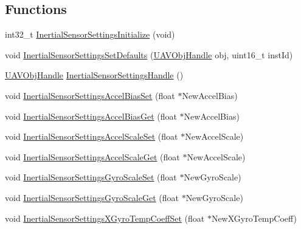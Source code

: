 \subsection*{\-Functions}
\begin{DoxyCompactItemize}
\item 
int32\-\_\-t \hyperlink{group___inertial_sensor_settings_ga45dd265a9f39272cac98af427a8ac647}{\-Inertial\-Sensor\-Settings\-Initialize} (void)
\item 
void \hyperlink{group___inertial_sensor_settings_ga06fcacea7c743f31b702b7bf28253303}{\-Inertial\-Sensor\-Settings\-Set\-Defaults} (\hyperlink{targets_2_u_a_v_objects_2inc_2uavobjectmanager_8h_a279053e22be53ce9f895043aaeb91e3b}{\-U\-A\-V\-Obj\-Handle} obj, uint16\-\_\-t inst\-Id)
\item 
\hyperlink{targets_2_u_a_v_objects_2inc_2uavobjectmanager_8h_a279053e22be53ce9f895043aaeb91e3b}{\-U\-A\-V\-Obj\-Handle} \hyperlink{group___inertial_sensor_settings_gae2acde2c9e350bfc6e75eb353539595b}{\-Inertial\-Sensor\-Settings\-Handle} ()
\item 
void \hyperlink{group___inertial_sensor_settings_gadacb52c94334a1e825853960f99fd969}{\-Inertial\-Sensor\-Settings\-Accel\-Bias\-Set} (float $\ast$\-New\-Accel\-Bias)
\item 
void \hyperlink{group___inertial_sensor_settings_gac5635ffeda88e0159a2cfb19e02b9bf7}{\-Inertial\-Sensor\-Settings\-Accel\-Bias\-Get} (float $\ast$\-New\-Accel\-Bias)
\item 
void \hyperlink{group___inertial_sensor_settings_ga3d1ace2f1b575c61f82d538ccab7b9f5}{\-Inertial\-Sensor\-Settings\-Accel\-Scale\-Set} (float $\ast$\-New\-Accel\-Scale)
\item 
void \hyperlink{group___inertial_sensor_settings_ga723bea612579f18d0e802a6e7fa384bf}{\-Inertial\-Sensor\-Settings\-Accel\-Scale\-Get} (float $\ast$\-New\-Accel\-Scale)
\item 
void \hyperlink{group___inertial_sensor_settings_gaff2974d132cc980bd04c5b1c24ab2cdc}{\-Inertial\-Sensor\-Settings\-Gyro\-Scale\-Set} (float $\ast$\-New\-Gyro\-Scale)
\item 
void \hyperlink{group___inertial_sensor_settings_ga9dd9d1dea123ef764d10a4024b3f90ea}{\-Inertial\-Sensor\-Settings\-Gyro\-Scale\-Get} (float $\ast$\-New\-Gyro\-Scale)
\item 
void \hyperlink{group___inertial_sensor_settings_ga6990e9b186cf024000d3c2c99674bb87}{\-Inertial\-Sensor\-Settings\-X\-Gyro\-Temp\-Coeff\-Set} (float $\ast$\-New\-X\-Gyro\-Temp\-Coeff)
\item 

\end{DoxyCompactItemize}

